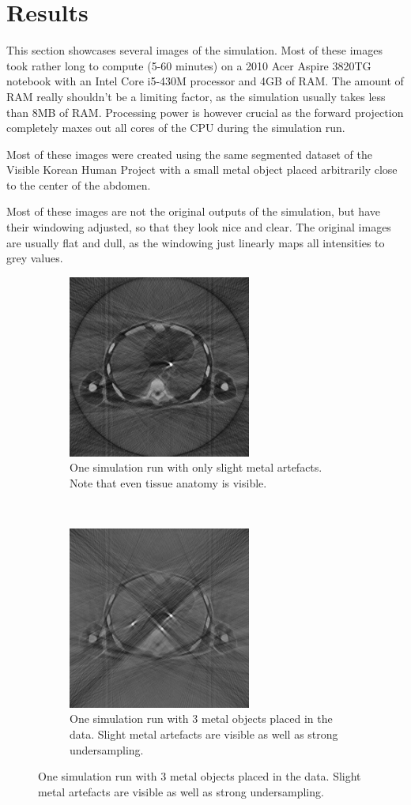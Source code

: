 \chapter{Results}
\par This section showcases several images of the simulation. Most of these images took rather long to compute (5-60 minutes) on a 2010 Acer Aspire 3820TG notebook with an Intel Core i5-430M processor and 4GB of RAM. The amount of RAM really shouldn't be a limiting factor, as the simulation usually takes less than 8MB of RAM. Processing power is however crucial as the forward projection completely maxes out all cores of the CPU during the simulation run.
\par Most of these images were created using the same segmented dataset of the Visible Korean Human Project\cite{visibleKorean} with a small metal object placed arbitrarily close to the center of the abdomen.
\par Most of these images are not the original outputs of the simulation, but have their windowing adjusted, so that they look nice and clear. The original images are usually flat and dull, as the windowing just linearly maps all intensities to grey values.
\begin{figure}[h]
	\centering
	\begin{subfigure}[h]{0.45\textwidth}
		\centering
		\includegraphics[height=6cm]{images/sim01.png}
		\caption{One simulation run with only slight metal artefacts. Note that even tissue anatomy is visible.\\}
		\label{sim01}
	\end{subfigure}%
	~
	\begin{subfigure}[h]{0.45\textwidth}
		\centering
		\includegraphics[height=6cm]{images/sim02.png}
		\caption{One simulation run with 3 metal objects placed in the data. Slight metal artefacts are visible as well as strong undersampling.}
		\label{sim02}
	\end{subfigure}%
\end{figure}
